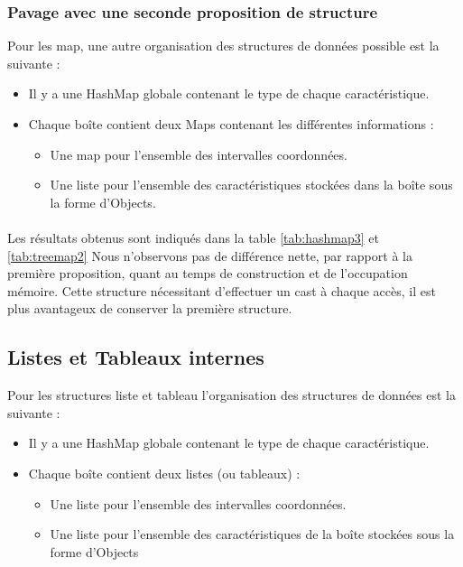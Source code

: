\subsubsection{Pavage avec une seconde proposition de structure}
Pour les map, une autre organisation des structures de données possible est la suivante :
\begin{itemize}
\item Il y a une HashMap globale contenant le type de chaque caractéristique.
 \item Chaque boîte contient deux Maps contenant les différentes informations :
\begin{itemize}
 \item Une map pour l'ensemble des intervalles coordonnées.
\item Une liste pour l'ensemble des caractéristiques stockées dans la boîte sous la forme d'Objects.
\end{itemize}
\end{itemize}

\paragraph{}Les résultats obtenus sont indiqués dans la table \ref{tab:hashmap3} et \ref{tab:treemap2}
Nous n'observons pas de différence nette, par rapport à la première proposition, quant au temps de construction et de l'occupation mémoire. Cette structure nécessitant d'effectuer un cast à chaque accès, il est plus avantageux de conserver la première structure.


\subsection{Listes et Tableaux internes}
Pour les structures liste et tableau l'organisation des structures de données est la suivante :
\begin{itemize}
\item Il y a une HashMap globale contenant le type de chaque caractéristique.
 \item Chaque boîte contient deux listes (ou tableaux) :
\begin{itemize}
 \item Une liste pour l'ensemble des intervalles coordonnées.
\item Une liste pour l'ensemble des caractéristiques de la boîte stockées sous la forme d'Objects
\end{itemize}
\end{itemize}

